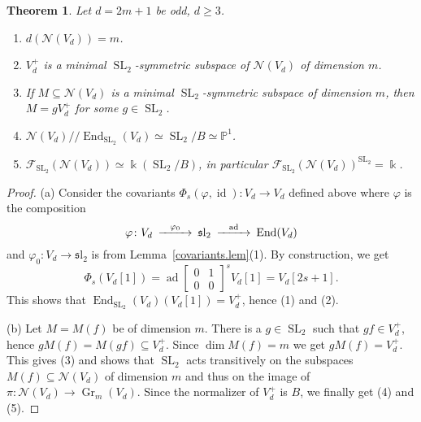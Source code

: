 \documentclass{amsart}
\newtheorem{thm}{Theorem}[section]
\theoremstyle{definition}
\theoremstyle{remark}
\begin{document}
\begin{thm}\label{thm3}
Let $d =2m+1$ be odd, $d\geq 3$.
\begin{enumerate}
\item $d({\mathcal N}(V_{d})) = m$.
\item $V_{d}^{+}$ is a minimal ${\operatorname{SL}_{2}}$-symmetric subspace of ${\mathcal N}(V_{d})$ of dimension $m$.
\item If $M {\subseteq} {\mathcal N}(V_{d})$ is a minimal ${\operatorname{SL}_{2}}$-symmetric subspace of dimension $m$, then $M = gV_{d}^{+}$ for some $g \in{\operatorname{SL}_{2}}$.
\item ${\mathcal N}(V_{d}){/\!\!/} \operatorname{End}_{\operatorname{SL}_{2}}(V_{d}) \simeq {\operatorname{SL}_{2}}/B \simeq {\mathbb P}^{1}$.
\item ${\mathcal F}_{\operatorname{SL}_{2}}({\mathcal N}(V_{d})) \simeq {\Bbbk}({\operatorname{SL}_{2}}/B)$, in particular ${\mathcal F}_{\operatorname{SL}_{2}}({\mathcal N}(V_{d}))^{\operatorname{SL}_{2}} ={\Bbbk}$.
\end{enumerate}
\end{thm}
\begin{proof}
(a) Consider the covariants $\Phi_{s}({\varphi},\operatorname{id})\colon V_{d}\to V_{d}$ defined above where ${\varphi}$ is the composition
$$
\begin{CD}
{\varphi} \colon V_{d} @>{{\varphi}_{0}}>> \operatorname{{\mathfrak sl}_{2}} @>\operatorname{ad}>> \operatorname{End}(V_{d})
\end{CD}
$$
and ${\varphi}_{0}\colon V_{d}\to \operatorname{{\mathfrak sl}_{2}}$ is from Lemma~\ref{covariants.lem}(1). By construction, we get
$$
\Phi_{s}(V_{d}[1]) = \operatorname{ad}{\left[\begin{smallmatrix} 0 & 1 \\ 0 & 0\end{smallmatrix}\right]}^{s}V_{d}[1] = V_{d}[2s+1].
$$
This shows that $\operatorname{End}_{\operatorname{SL}_{2}}(V_{d}) (V_{d}[1] )= V_{d}^{+}$, hence (1) and (2).
\par\smallskip
(b) Let  $M = M(f)$ be of dimension $m$. There is a $g\in{\operatorname{SL}_{2}}$ such that $gf \in V_{d}^{+}$, hence $gM(f) = M(gf) \subseteq V_{d}^{+}$. Since $\dim M(f) = m$ we get $gM(f)  = V_{d}^{+}$. This gives (3) and shows that ${\operatorname{SL}_{2}}$ acts transitively on the subspaces $M(f){\subseteq} {\mathcal N}(V_{d})$ of dimension $m$ and thus on the image of $\pi\colon {\mathcal N}(V_{d}) \to \operatorname{Gr}_{m}(V_{d})$. Since the normalizer of $V_{d}^{+}$ is $B$, we finally get (4) and (5).
\end{proof}
\end{document}
